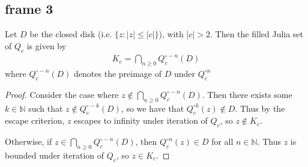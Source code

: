 \documentclass[xcolor=x11names,compress]{beamer}
\renewcommand{\(}{\begin{columns}}
\renewcommand{\)}{\end{columns}}
\newcommand{\<}[1]{\begin{column}{#1}}
\renewcommand{\>}{\end{column}}
\begin{document}


\subsection{frame 3}
\begin{frame}

\begin{theorem}
Let $D$ be the closed disk (i.e. $\{z : |z| \le |c|\}$), with $|c|>2$. Then the filled Julia set of $Q_c$ is given by
\begin{align*}
K_c = \bigcap\limits_{n\ge 0} Q_c^{\circ -n} (D)
\end{align*}
where $Q_c^{\circ -n} (D)$ denotes the preimage of $D$ under $Q_c^{\circ n}$
\end{theorem}

\pause

\begin{proof}
    Consider the case where
    $z\notin \bigcap_{n\ge 0} Q_c^{\circ -n} (D)$.
    Then there exists some $k\in \mathbb{N}$ such that $z\notin Q_c^{\circ -k} (D)$,
    so we have that $Q_c^{\circ k}(z) \notin D$. 
    Thus by the escape criterion, $z$ escapes to infinity under iteration
    of $Q_c$, so $z\notin K_c$.  

    Otherwise, if $z\in \bigcap_{n\ge 0} Q_c^{\circ -n} (D)$, then 
     $Q_c^{\circ n}(z) \in D$ for all $n\in \mathbb{N}$. Thus $z$ is bounded under
     iteration of $Q_c$, so $z\in K_c$.
\end{proof}
\end{frame}


\end{document}
